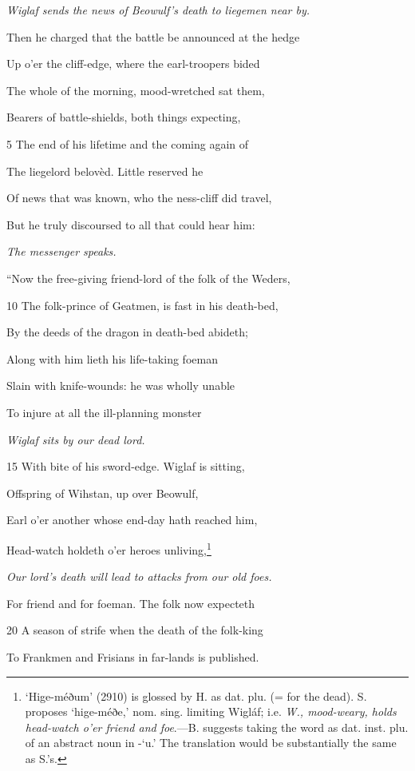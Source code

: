 \emph{Wiglaf sends the
news of Beowulf’s
death to liegemen
near by.}

Then he charged that the battle be announced at the hedge

Up o’er the cliff-edge, where the earl-troopers bided

The whole of the morning, mood-wretched sat them,

Bearers of battle-shields, both things expecting,

5
The end of his lifetime and the coming again of

The liegelord belovèd. Little reserved he

Of news that was known, who the ness-cliff did travel,

But he truly discoursed to all that could hear him:

\emph{The messenger
speaks.}

“Now the free-giving friend-lord of the folk of the Weders,

10
The folk-prince of Geatmen, is fast in his death-bed,

By the deeds of the dragon in death-bed abideth;

Along with him lieth his life-taking foeman

Slain with knife-wounds: he was wholly unable

To injure at all the ill-planning monster

\emph{Wiglaf sits by our
dead lord.}

15
With bite of his sword-edge. Wiglaf is sitting,

Offspring of Wihstan, up over Beowulf,

Earl o’er another whose end-day hath reached him,

Head-watch holdeth o’er heroes unliving,\footnote{‘Hige-méðum’ (2910) is glossed by H. as dat. plu. (= for the dead). S.
proposes ‘hige-méðe,’ nom. sing. limiting Wigláf; i.e. \emph{W., mood-weary, holds
head-watch o’er friend and foe}.—B. suggests taking the word as dat. inst.
plu. of an abstract noun in -‘u.’ The translation would be substantially the
same as S.’s.}

\emph{Our lord’s death
will lead to
attacks from our
old foes.}

For friend and for foeman. The folk now expecteth

20
A season of strife when the death of the folk-king

To Frankmen and Frisians in far-lands is published.


